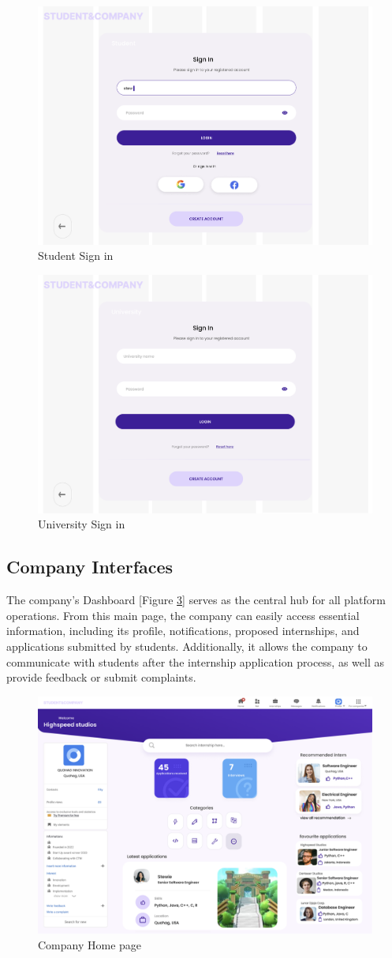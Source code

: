 \begin{figure} [H]
    \centering
    \includegraphics[width=0.5\linewidth]{Images/Interface Images/log in sing up/Screenshot 2024-12-12 045127.png}
    \caption{Student Sign in}
    \label{fig: Student Sign in}
\end{figure}

\begin{figure} [H]
    \centering
    \includegraphics[width=0.5\linewidth]{RASD/Interface Images/log in sing up/Screenshot 2024-12-12 045139.png}
    \caption{University Sign in}
    \label{fig:University Sign in}
\end{figure}


\subsection{Company Interfaces}

The company's Dashboard [Figure \ref{fig:Company Home page}] serves as the central hub for all platform operations. From this main page, the company can easily access essential information, including its profile, notifications, proposed internships, and applications submitted by students. Additionally, it allows the company to communicate with students after the internship application process, as well as provide feedback or submit complaints.

\begin{figure} [H]
    \centering
    \includegraphics[width=0.5\linewidth]{Images/Interface Images/company interface/Screenshot 2024-12-12 045319.png}
    \caption{Company Home page}
    \label{fig:Company Home page}
\end{figure}

